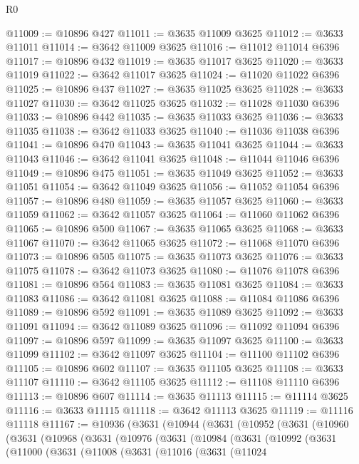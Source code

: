 \begin{lexlean}{R0}
\begin{coremodule}
@11009 := @10896 @427
@11011 := @3635 @11009 @3625
@11012 := @3633 @11011
@11014 := @3642 @11009 @3625
@11016 := @11012 @11014 @6396
@11017 := @10896 @432
@11019 := @3635 @11017 @3625
@11020 := @3633 @11019
@11022 := @3642 @11017 @3625
@11024 := @11020 @11022 @6396
@11025 := @10896 @437
@11027 := @3635 @11025 @3625
@11028 := @3633 @11027
@11030 := @3642 @11025 @3625
@11032 := @11028 @11030 @6396
@11033 := @10896 @442
@11035 := @3635 @11033 @3625
@11036 := @3633 @11035
@11038 := @3642 @11033 @3625
@11040 := @11036 @11038 @6396
@11041 := @10896 @470
@11043 := @3635 @11041 @3625
@11044 := @3633 @11043
@11046 := @3642 @11041 @3625
@11048 := @11044 @11046 @6396
@11049 := @10896 @475
@11051 := @3635 @11049 @3625
@11052 := @3633 @11051
@11054 := @3642 @11049 @3625
@11056 := @11052 @11054 @6396
@11057 := @10896 @480
@11059 := @3635 @11057 @3625
@11060 := @3633 @11059
@11062 := @3642 @11057 @3625
@11064 := @11060 @11062 @6396
@11065 := @10896 @500
@11067 := @3635 @11065 @3625
@11068 := @3633 @11067
@11070 := @3642 @11065 @3625
@11072 := @11068 @11070 @6396
@11073 := @10896 @505
@11075 := @3635 @11073 @3625
@11076 := @3633 @11075
@11078 := @3642 @11073 @3625
@11080 := @11076 @11078 @6396
@11081 := @10896 @564
@11083 := @3635 @11081 @3625
@11084 := @3633 @11083
@11086 := @3642 @11081 @3625
@11088 := @11084 @11086 @6396
@11089 := @10896 @592
@11091 := @3635 @11089 @3625
@11092 := @3633 @11091
@11094 := @3642 @11089 @3625
@11096 := @11092 @11094 @6396
@11097 := @10896 @597
@11099 := @3635 @11097 @3625
@11100 := @3633 @11099
@11102 := @3642 @11097 @3625
@11104 := @11100 @11102 @6396
@11105 := @10896 @602
@11107 := @3635 @11105 @3625
@11108 := @3633 @11107
@11110 := @3642 @11105 @3625
@11112 := @11108 @11110 @6396
@11113 := @10896 @607
@11114 := @3635 @11113
@11115 := @11114 @3625
@11116 := @3633 @11115
@11118 := @3642 @11113 @3625
@11119 := @11116 @11118
@11167 := @10936
    (@3631
      (@10944
        (@3631
          (@10952
            (@3631
              (@10960
                (@3631
                  (@10968
                    (@3631
                      (@10976
                        (@3631
                          (@10984
                            (@3631
                              (@10992
                                (@3631
                                  (@11000
                                    (@3631
                                      (@11008
                                        (@3631
                                          (@11016
                                            (@3631
                                              (@11024

\end{coremodule}
\end{lexlean}
